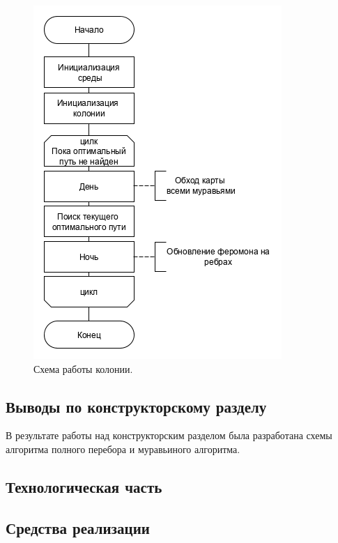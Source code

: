 \documentclass[a4paper,12pt]{article}
\begin{document}
			\begin{figure}[H]	
				{
					\centering
					\includegraphics[scale=0.75]{ant_alg.png}
					\caption{Схема работы колонии.}
					\label{pic:antalg_schema}
				}
			\end{figure}
    
    \begin{center}
    	\subsection{Выводы по конструкторскому разделу}    
    \end{center}
   
    	\quad В результате работы над конструкторским разделом была разработана схемы алгоритма полного перебора и муравьиного алгоритма.
    	
    \newpage
    
    \begin{center}
     	\section{Технологическая часть}
        \subsection{Средства реализации}    
    \end{center}
    
\end{document}
